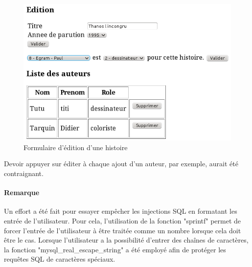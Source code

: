 \documentclass[12pt]{article}
\begin{document}
\begin{figure}[h!]
\begin{center}
\noindent\includegraphics[]{formulaire-edition-histoire}
  \caption{Formulaire d'édition d'une histoire}
\end{center}
\end{figure}

Devoir appuyer sur éditer à chaque ajout d'un auteur, par exemple, aurait été
contraignant.

\paragraph{Remarque}
Un effort a été fait pour essayer empêcher les injections SQL en formatant
les entrée de l'utilisateur. Pour cela, l'utilisation de la fonction "sprintf"
permet de forcer l'entrée de l'utilisateur à être traitée comme un nombre
lorsque cela doit être le cas. Lorsque l'utilisateur a la possibilité
d'entrer des chaînes de caractères, la fonction "mysql\_real\_escape\_string"
a été employé afin de protéger les requêtes SQL de caractères spéciaux.
\end{document}
